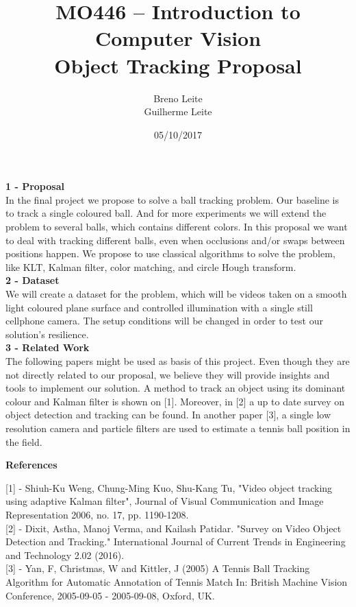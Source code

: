 \documentclass[12pt,a4paper]{article}
\title{MO446 -- Introduction to Computer Vision  \\ Object Tracking Proposal}
\author{Breno Leite  \\ Guilherme Leite}
\date{05/10/2017}
\begin{document}
\maketitle


\textbf{\LARGE 1 - Proposal} \\

	In the final project we propose to solve a ball tracking problem. Our baseline is to track a single coloured ball. And for more experiments we will extend the problem to several balls, which contains different colors. In this proposal we want to deal with tracking different balls, even when occlusions and/or swaps between positions happen. We propose to use classical algorithms to solve the problem, like KLT, Kalman filter, color matching, and circle Hough transform. \\
	
\textbf{\LARGE 2 - Dataset} \\

	We will create a dataset for the problem, which will be videos taken on a smooth light coloured plane surface and controlled illumination with a single still cellphone camera. The setup conditions will be changed in order to test our solution's resilience.\\

\textbf{\LARGE 3 - Related Work} \\

	The following papers might be used as basis of this project. Even though they are not directly related to our proposal, we believe they will provide insights and tools to implement our solution.
	A method to track an object using its dominant colour and Kalman filter is shown on [1]. Moreover, in [2] a up to date survey on object detection and tracking can be found. In another paper [3], a single low resolution camera and particle filters are used to estimate a tennis ball position in the field.\\
	
\newpage
	
\centerline{\textbf{\LARGE References}}

[1] - Shiuh-Ku Weng, Chung-Ming Kuo, Shu-Kang Tu, "Video object tracking using adaptive Kalman filter", Journal of Visual Communication and Image Representation 2006, no. 17, pp. 1190-1208. \\

[2] - Dixit, Astha, Manoj Verma, and Kailash Patidar. "Survey on Video Object Detection and Tracking." International Journal of Current Trends in Engineering and Technology 2.02 (2016). \\ 

[3] - Yan, F, Christmas, W and Kittler, J (2005) A Tennis Ball Tracking Algorithm for Automatic Annotation of Tennis Match In: British Machine Vision Conference, 2005-09-05 - 2005-09-08, Oxford, UK. \\
\end{document}

